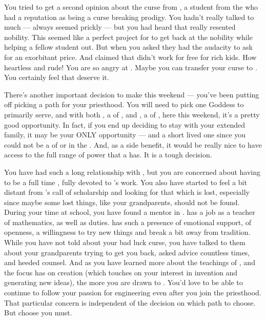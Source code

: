 \documentclass[char]{GL2020}
\begin{document}
You tried to get a second opinion about the curse from \cAdopted{\full}, a student from the \pFarm{} who had a reputation as being a curse breaking prodigy. You hadn’t really talked to \cAdopted{\them} much — \cAdopted{\they} always seemed prickly — but you had heard that \cAdopted{\they} really resented \pFarm{} nobility. This seemed like a perfect project for \cAdopted{\them} to get back at the nobility while helping a fellow student out. But when you asked \cAdopted{\them} they had the audacity to ask for an exorbitant price. And claimed that \cAdopted{\they} didn’t work for free for rich kids. How heartless and rude! You are so angry at \cAdopted{\them}. Maybe you can transfer your curse to \cAdopted{\them}. You certainly feel that \cAdopted{\they} deserve it. 

There's another important decision to make this weekend — you've been putting off picking a path for your priesthood. You will need to pick one Goddess to primarily serve, and with both \cEbbPriest{\full}, a \cEbbPriest{\cleric} of \cEbbFull{\full}, and \cFlowPriest{\full}, a \cFlowPriest{\cleric} of \cFlowFull{\full}, here this weekend, it's a pretty good opportunity. In fact, if you end up deciding to stay with your extended family, it may be your ONLY opportunity — and a short lived one since you could not be a \cInitiate{\cleric} of \cEbb{} or \cFlow{} in the \pFarm{}. 
And, as a side benefit, it would be really nice to have access to the full range of power that a \cInitiate{\cleric} has. It is a tough decision. 

You have had such a long relationship with \cEbbPriest{}, but you are concerned about having to be a full time \cInitiate{\cleric}, fully devoted to \cEbb{}’s work. You also have started to feel a bit distant from \cEbb{}’s call of scholarship and looking for that which is lost, especially since maybe some lost things, like your grandparents, should not be found. During your time at school, you have found a mentor in \cFlowPriest{}. \cFlowPriest{} has a job as a teacher of mathematics, as well as \cFlowPriest{\their} \cFlowPriest{\cleric} duties. \cFlowPriest{} has such a presence of emotional support, of openness, a willingness to try new things and break a bit away from tradition. While you have not told \cFlowPriest{\them} about your bad luck curse, you have talked to them about your grandparents trying to get you back, asked \cFlowPriest{\their} advice countless times, and heeded \cFlowPriest{\their} counsel. And as you have learned more about the teachings of \cFlow{}, and the focus \cFlow{} has on creation (which touches on your interest in invention and generating new ideas), the more you are drawn to \cFlow{\them}. You'd love to be able to continue to follow your passion for engineering even after you join the priesthood. That particular concern is independent of the decision on which path to choose. But choose you must.  
\end{document}
